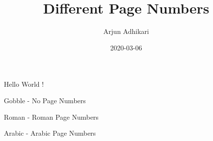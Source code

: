 \documentclass{article}
\title{Different Page Numbers}
\author{Arjun Adhikari}
\date{2020-03-06}
\begin{document}
	\maketitle	
	\newpage
	Hello World !
	
	Gobble - No Page Numbers
	
	Roman - Roman Page Numbers
	
	Arabic - Arabic Page Numbers
\end{document}
